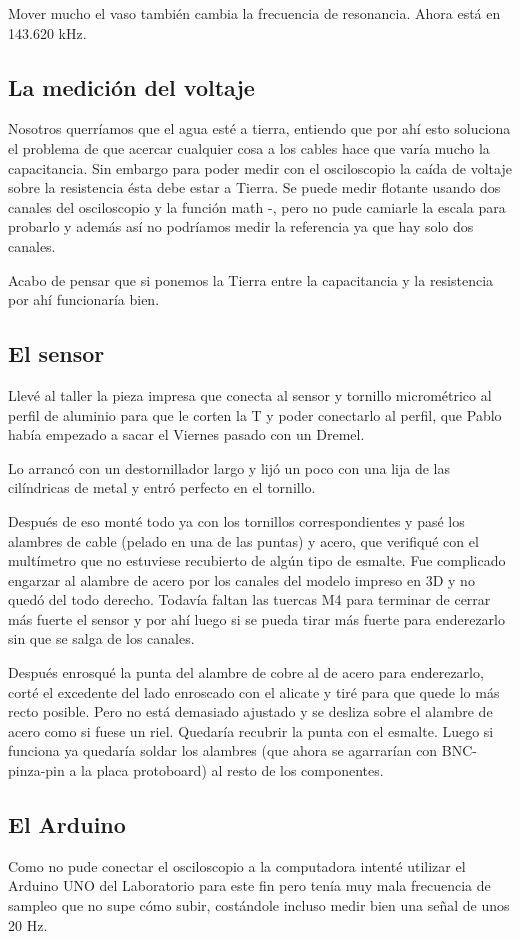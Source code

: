 Mover mucho el vaso también cambia la frecuencia de resonancia. Ahora está en 143.620 kHz.  

\subsection*{La medición del voltaje}
Nosotros querríamos que el agua esté a tierra, entiendo que por ahí esto soluciona el problema de que acercar cualquier cosa a los cables hace que varía mucho la capacitancia. Sin embargo para poder medir con el osciloscopio la caída de voltaje sobre la resistencia ésta debe estar a Tierra. Se puede medir flotante usando dos canales del osciloscopio y la función math -, pero
no pude camiarle la escala para probarlo y además así no podríamos medir la referencia ya que hay solo dos canales.

Acabo de pensar que si ponemos la Tierra entre la capacitancia y la resistencia por ahí funcionaría bien.



\subsection*{El sensor}
Llevé al taller la pieza impresa que conecta al sensor y tornillo micrométrico al perfil de aluminio para que le corten la T y poder conectarlo al perfil, que Pablo había empezado a sacar el Viernes pasado con un Dremel. 

Lo arrancó con un destornillador largo y lijó un poco con una lija de las cilíndricas de metal y entró perfecto en el tornillo. 

Después de eso monté todo ya con los tornillos correspondientes y pasé los alambres de cable (pelado en una de las puntas) y acero, que verifiqué con el multímetro que no estuviese recubierto de algún tipo de esmalte. Fue complicado engarzar al alambre de acero por los canales del modelo impreso en 3D y no quedó del todo derecho. Todavía faltan las tuercas M4 para terminar de cerrar más fuerte el sensor y por ahí luego si se pueda tirar más fuerte para enderezarlo sin que se salga de los canales. %

Después enrosqué la punta del alambre de cobre al de acero para enderezarlo, corté el excedente del lado enroscado con el alicate y tiré para que quede lo más recto posible. Pero no está demasiado ajustado y se desliza sobre el alambre de acero como si fuese un riel. Quedaría recubrir la punta con el esmalte. Luego si funciona ya quedaría soldar los alambres (que ahora se agarrarían con BNC-pinza-pin a la placa protoboard) al resto de los componentes.


\subsection*{El Arduino} 
Como no pude conectar el osciloscopio a la computadora intenté utilizar el Arduino UNO del Laboratorio para este fin pero tenía muy mala frecuencia de sampleo que no supe cómo subir, costándole incluso medir bien una señal de unos 20 Hz. %